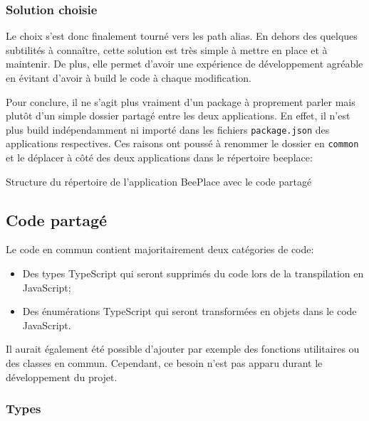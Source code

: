 \subsubsection{Solution choisie}

Le choix s'est donc finalement tourné vers les path alias. En dehors des quelques subtilités à connaître, cette solution est très simple à mettre en place et à maintenir. De plus, elle permet d'avoir une expérience de développement agréable en évitant d'avoir à build le code à chaque modification.

Pour conclure, il ne s'agit plus vraiment d'un package à proprement parler mais plutôt d'un simple dossier partagé entre les deux applications. En effet, il n'est plus build indépendamment ni importé dans les fichiers \texttt{package.json} des applications respectives. Ces raisons ont poussé à renommer le dossier en \texttt{common} et le déplacer à côté des deux applications dans le répertoire beeplace:

\begin{listing}[H]
  \begin{tcolorbox}[arc=0mm,colback=white!5!white]
  \end{tcolorbox}
  \caption{Structure du répertoire de l'application BeePlace avec le code partagé}
  \label{listing:beeplace-repo-structure-v2}
\end{listing}

\subsection{Code partagé}

Le code en commun contient majoritairement deux catégories de code:

\begin{itemize}
  \item Des types TypeScript qui seront supprimés du code lors de la transpilation en JavaScript;
  \item Des énumérations TypeScript qui seront transformées en objets dans le code JavaScript.
\end{itemize}

Il aurait également été possible d'ajouter par exemple des fonctions utilitaires ou des classes en commun. Cependant, ce besoin n'est pas apparu durant le développement du projet.

\subsubsection{Types}

